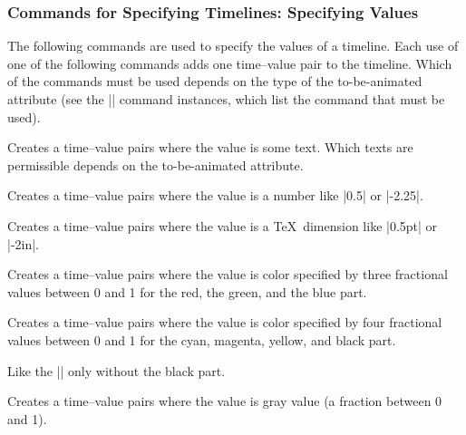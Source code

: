 \subsubsection{Commands for Specifying Timelines: Specifying Values}

The following commands are used to specify the values of a
timeline. Each use of one of the following commands adds one
time--value pair to the timeline. Which of the commands must be used
depends on the type of the to-be-animated attribute (see the
|\pgfsys@animate| command instances, which list the command that must be
used). 


\begin{command}{\pgfsys@animation@val@text{}}
  Creates a time--value pairs where the value is some text. Which
  texts are permissible depends on the to-be-animated attribute.
\end{command}

\begin{command}{\pgfsys@animation@val@scalar{}}
  Creates a time--value pairs where the value is a number like |0.5|
  or |-2.25|.
\end{command}

\begin{command}{\pgfsys@animation@val@dimension{}}
  Creates a time--value pairs where the value is a \TeX\ dimension
  like |0.5pt| or |-2in|.
\end{command}

\begin{command}{\pgfsys@animation@val@color@rgb{}}
  Creates a time--value pairs where the value is color
  specified by three fractional values between 0 and 1 for the red,
  the green, and the blue part.
\end{command}

\begin{command}{\pgfsys@animation@val@color@cmyk{}}
  Creates a time--value pairs where the value is color
  specified by four fractional values between 0 and 1 for the cyan,
  magenta, yellow, and black part.
\end{command}

\begin{command}{\pgfsys@animation@val@color@cmy{}}
  Like the |\pgfsys@animation@color@cmyk| only without the black part.
\end{command}

\begin{command}{\pgfsys@animation@color@gray{}}
  Creates a time--value pairs where the value is gray value (a
  fraction between 0 and 1).
\end{command}

